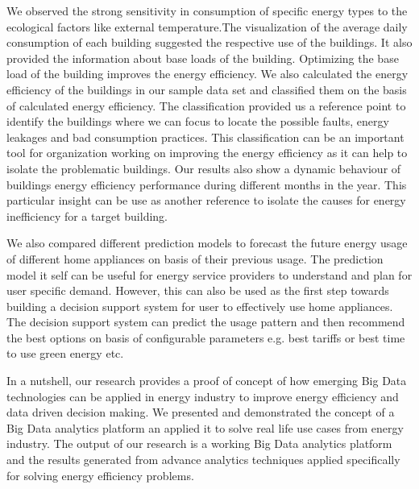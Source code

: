 We observed the strong sensitivity in consumption of specific energy types to the ecological factors like external temperature.The visualization of the average daily consumption of each building suggested the respective use of the buildings. It also provided the information about base loads of the building. Optimizing the base load of the building improves the energy efficiency. We also calculated the energy efficiency of the buildings in our sample data set and classified them on the basis of calculated energy efficiency. The classification provided us a reference point to identify the buildings where we can focus to locate the possible faults, energy leakages and bad consumption practices. This classification can be an important tool for organization working on improving the energy efficiency as it can help to isolate the problematic buildings. Our results also show a dynamic behaviour of buildings energy efficiency performance during different months in the year. This particular insight can be use as another reference to isolate the causes for energy inefficiency for a target building.

We also compared different prediction models to forecast the future energy usage of different home appliances on basis of their previous usage. The prediction model it self can be useful for energy service providers to understand and plan for user specific demand. However, this can also be used as the first step towards building a decision support system for user to effectively use home appliances. The decision support system can predict the usage pattern and then recommend the best options on basis of configurable parameters e.g. best tariffs or best time to use green energy etc. 

In a nutshell, our research provides a proof of concept of how emerging Big Data technologies can be applied in energy industry to improve energy efficiency and data driven decision making. We presented and demonstrated the concept of a Big Data analytics platform an applied it to solve real life use cases from energy industry. The output of our research is a working Big Data analytics platform and the results generated from advance analytics techniques applied specifically for solving energy efficiency problems.  
     

